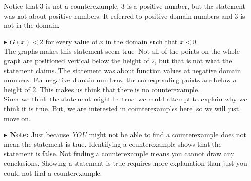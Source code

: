 \documentclass{ximera}
\begin{document}
Notice that $3$ is not a counterexample.  $3$ is a positive number, but the statement was not about positive numbers.  It referred to positive domain numbers and $3$ is not in the domain.














\textbf{\textcolor{red!90!darkgray}{$\blacktriangleright$}} $G(x) < 2$  for every value of $x$ in the domain such that $x < 0$. \\

The graphs makes this statement seem true.  Not all of the points on the whole graph are positioned vertical below the height of $2$, but that is not what the statement claims. The statement was about function values at negative domain numbers. For negative domain numbers, the corresponding points are below a height of $2$.  This makes us think that there is no counterexample.  \\

Since we think the statement might be true, we could attempt to explain why we think it is true.  But, we are interested in counterexamples here, so we will just move on.








\textbf{$\blacktriangleright$ Note:}  Just because \textit{YOU} might not be able to find a counterexample does not mean the statement is true.  Identifying a counterexample shows that the statement is false. Not finding a counterexample means you cannot draw any conclusions.  Showing a statement is true requires more explanation than just you could not find a counterexample. \\
\end{document}
